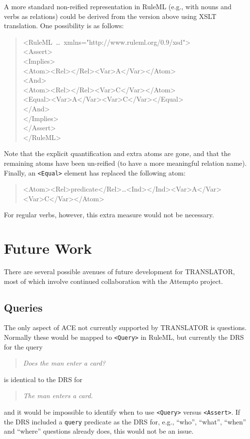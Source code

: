 \documentclass[12pt]{report}
\begin{document}
A more standard non-reified representation in RuleML (e.g., with nouns and verbs as relations) could be derived from the version above using XSLT translation. One possibility is as follows:
\begin{quote}
\small
\ttfamily
\setlength{\parindent}{0.1in}
<RuleML~\ldots~xmlns="http://www.ruleml.org/0.9/xsd">\\
\indent <Assert>\\
\indent \indent <Implies>\\
\indent \indent \indent <Atom><Rel></Rel><Var>A</Var></Atom>\\
\indent \indent \indent <And>\\
\indent \indent \indent \indent <Atom><Rel></Rel><Var>C</Var></Atom>\\
\indent \indent \indent \indent <Equal><Var>A</Var><Var>C</Var></Equal>\\
\indent \indent \indent </And>\\
\indent \indent </Implies>\\
\indent </Assert>\\
</RuleML>
\setlength{\parindent}{0.0in}
\normalfont
\end{quote}
Note that the explicit quantification and extra atoms are gone, and that the remaining atoms have been un-reified (to have a more meaningful relation name). Finally, an \verb|<Equal>| element has replaced the following atom:
\begin{quote}
\small
\ttfamily
<Atom><Rel>predicate</Rel>\ldots<Ind></Ind><Var>A</Var><Var>C</Var></Atom>
\normalfont
\end{quote}
For regular verbs, however, this extra measure would not be necessary.

\chapter{Future Work}

There are several possible avenues of future development for TRANSLATOR, most of which involve continued collaboration with the Attempto project.

\section{Queries}
The only aspect of ACE not currently supported by TRANSLATOR is questions. Normally these would be mapped to \verb|<Query>| in RuleML, but currently the DRS for the query
\begin{quote}
\textit{Does the man enter a card?}
\end{quote}
is identical to the DRS for
\begin{quote}
\textit{The man enters a card.}
\end{quote}
and it would be impossible to identify when to use \verb|<Query>| versus \verb|<Assert>|. If the DRS included a \verb|query| predicate as the DRS for, e.g., ``who'', ``what'', ``when'' and ``where'' questions already does, this would not be an issue.
\end{document}
